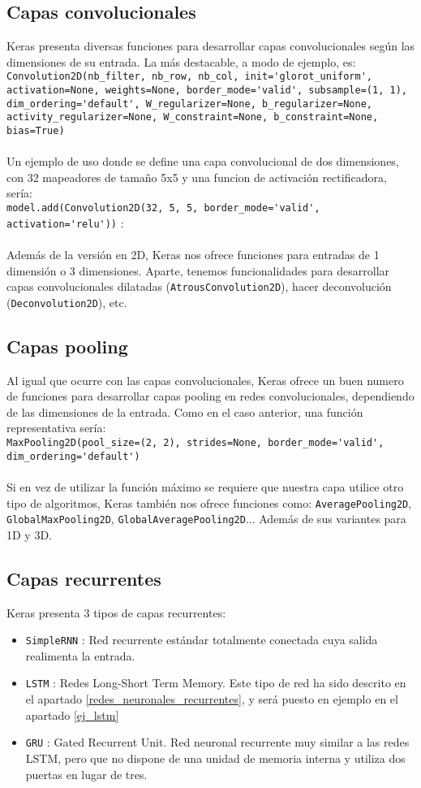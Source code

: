 \subsection{Capas convolucionales}
Keras presenta diversas funciones para desarrollar capas convolucionales según las dimensiones de su entrada. La más destacable, a modo de ejemplo, es:\\
\lstinline{Convolution2D(nb_filter, nb_row, nb_col, init='glorot_uniform', activation=None, weights=None, border_mode='valid', subsample=(1, 1), dim_ordering='default', W_regularizer=None, b_regularizer=None, activity_regularizer=None, W_constraint=None, b_constraint=None, bias=True)}\\\\
Un ejemplo de uso donde se define una capa convolucional de dos dimensiones, con 32 mapeadores de tamaño 5x5 y una funcion de activación rectificadora, sería:\\
\lstinline{model.add(Convolution2D(32, 5, 5, border_mode='valid', activation='relu'))} : \\\\
Además de la versión en 2D, Keras nos ofrece funciones para entradas de 1 dimensión o 3 dimensiones. Aparte, tenemos funcionalidades para desarrollar capas convolucionales dilatadas (\lstinline{AtrousConvolution2D}), hacer deconvolución (\lstinline{Deconvolution2D}), etc.
\subsection{Capas pooling}
Al igual que ocurre con las capas convolucionales, Keras ofrece un buen numero de funciones para desarrollar capas pooling en redes convolucionales, dependiendo de las dimensiones de la entrada. Como en el caso anterior, una función representativa sería:\\
\lstinline{MaxPooling2D(pool_size=(2, 2), strides=None, border_mode='valid', dim_ordering='default')}\\\\
Si en vez de utilizar la función máximo se requiere que nuestra capa utilice otro tipo de algoritmos, Keras también nos ofrece funciones como: \lstinline{AveragePooling2D}, \lstinline{GlobalMaxPooling2D}, \lstinline{GlobalAveragePooling2D}... Además de sus variantes para 1D y 3D.
\subsection{Capas recurrentes}
Keras presenta 3 tipos de capas recurrentes:
\begin{itemize}[noitemsep]
\item \lstinline{SimpleRNN} : Red recurrente estándar totalmente conectada cuya salida realimenta la entrada.
\item \lstinline{LSTM} : Redes Long-Short Term Memory. Este tipo de red ha sido descrito en el apartado \ref{redes_neuronales_recurrentes}, y será puesto en ejemplo en el apartado \ref{ej_lstm}
\item \lstinline{GRU} : Gated Recurrent Unit. Red neuronal recurrente muy similar a las redes LSTM, pero que no dispone de una unidad de memoria interna y utiliza dos puertas en lugar de tres.
\end{itemize}

